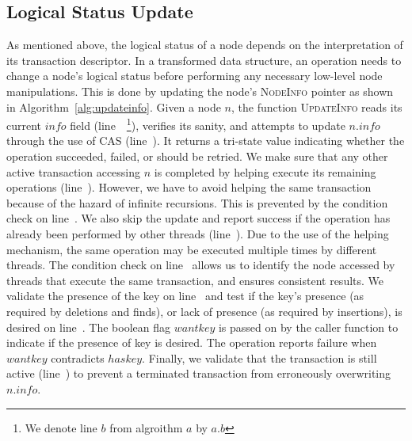 \documentclass{sig-alternate-05-2015}
\begin{document}
\subsection{Logical Status Update}
\label{sec:logicalupdate}
As mentioned above, the logical status of a node depends on the interpretation of its transaction descriptor. 
In a transformed data structure, an operation needs to change a node's logical status before performing any necessary low-level node manipulations. 
This is done by updating the node's \textsc{NodeInfo} pointer as shown in Algorithm~\ref{alg:updateinfo}. 
Given a node $n$, the function \textsc{UpdateInfo} reads its current $info$ field (line~~\footnote{We denote line $b$ from algroithm $a$ by $a.b$}), verifies its sanity, and attempts to update $n.info$ through the use of CAS (line~).
It returns a tri-state value indicating whether the operation succeeded, failed, or should be retried.
We make sure that any other active transaction accessing $n$ is completed by helping execute its remaining operations (line~).
However, we have to avoid helping the same transaction because of the hazard of infinite recursions.
This is prevented by the condition check on line~.
We also skip the update and report success if the operation has already been performed by other threads (line~).
Due to the use of the helping mechanism, the same operation may be executed multiple times by different threads.
The condition check on line~ allows us to identify the node accessed by threads that execute the same transaction, and ensures consistent results.
We validate the presence of the key on line~ and test if the key's presence (as required by deletions and finds), or lack of presence (as required by insertions), is desired on line~. The boolean flag $wantkey$ is passed on by the caller function to indicate if the presence of key is desired.
The operation reports failure when $wantkey$ contradicts $haskey$.
Finally, we validate that the transaction is still active (line~) to prevent a terminated transaction from erroneously overwriting $n.info$.
\end{document}
